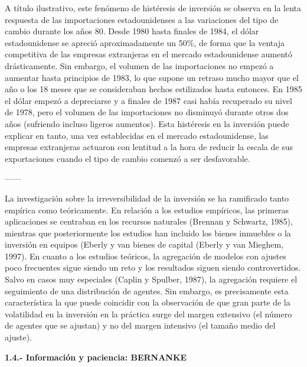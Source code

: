 \documentclass[10pt,a4paper]{article}
\begin{document}
A título ilustrativo, este fenómeno de histéresis de inversión se observa en la lenta respuesta de las importaciones estadounidenses a las variaciones del tipo de cambio durante los años 80. Desde 1980 hasta finales de 1984, el dólar estadounidense se apreció aproximadamente un 50\%, de forma que la ventaja competitiva de las empresas extranjeras en el mercado estadounidense aumentó drásticamente. Sin embargo, el volumen de las importaciones no empezó a aumentar hasta principios de 1983, lo que supone un retraso mucho mayor que el año o los 18 meses que se consideraban hechos estilizados hasta entonces. En 1985 el dólar empezó a depreciarse y a finales de 1987 casi había recuperado su nivel de 1978, pero el volumen de las importaciones no disminuyó durante otros dos años (sufriendo incluso ligeros aumentos). Esta histéresis en la inversión puede explicar en tanto, una vez establecidas en el mercado estadounidense, las empresas extranjeras actuaron con lentitud a la hora de reducir la escala de sus exportaciones cuando el tipo de cambio comenzó a ser desfavorable. 

------

La investigación sobre la irreversibilidad de la inversión se ha ramificado tanto empírica como teóricamente. En relación a los estudios empíricos, las primeras aplicaciones se centraban en los recursos naturales (Brennan y Schwartz, 1985), mientras que posteriormente los estudios han incluido los bienes inmuebles o la inversión en equipos (Eberly y van bienes de capital (Eberly y van Mieghem, 1997). En cuanto a los estudios teóricos, la agregación de modelos con ajustes poco frecuentes sigue siendo un reto y los resultados siguen siendo controvertidos. Salvo en casos muy especiales (Caplin y Spulber, 1987), la agregación requiere el seguimiento de una distribución de agentes. Sin embargo, es precisamente esta característica la que puede coincidir con la observación de que gran parte de la volatilidad en la inversión en la práctica surge del margen extensivo (el número de agentes que se ajustan) y no del margen intensivo (el tamaño medio del ajuste).



\textbf{1.4.- Información y paciencia: BERNANKE}
\end{document}
